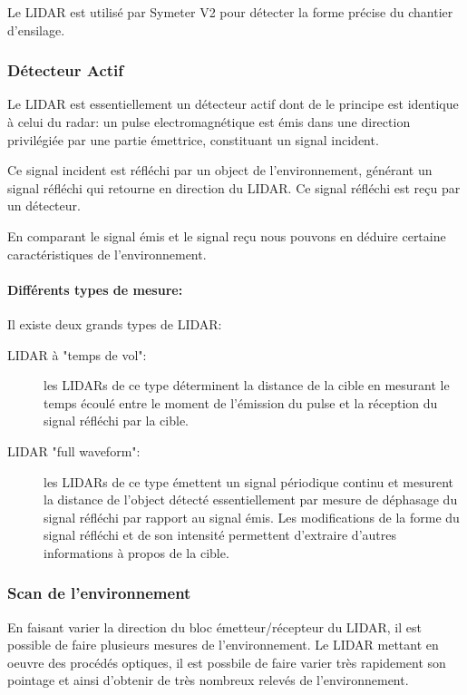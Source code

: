 \documentclass[12pt,a4paper]{report}
\begin{document}
		\para Le LIDAR est utilisé par Symeter V2 pour détecter la forme précise du chantier d'ensilage.
		
		\subsubsection{Détecteur Actif}
		Le LIDAR est essentiellement un détecteur actif dont de le principe est identique à celui du radar: un pulse electromagnétique est émis dans une direction privilégiée par une partie émettrice, constituant un signal incident. 
		
		\para Ce signal incident est réfléchi par un object de l'environnement, générant un signal réfléchi qui retourne en direction du LIDAR. Ce signal réfléchi est reçu par un détecteur. 
		
		\para En comparant le signal émis et le signal reçu nous pouvons en déduire certaine caractéristiques de l'environnement.
		
		\paragraph*{Différents types de mesure: } Il existe deux grands types de LIDAR: \begin{description}
			\item[LIDAR  à "temps de vol":] les LIDARs de ce type déterminent la distance de la cible en mesurant le temps écoulé entre le moment de l'émission du pulse et la réception du signal réfléchi par la cible.
			\item[LIDAR  "full waveform":] les LIDARs de ce type émettent un signal périodique continu et mesurent la distance de l'object détecté essentiellement par mesure de déphasage du signal réfléchi par rapport au signal émis. Les modifications de la forme du signal réfléchi et de son intensité permettent d'extraire d'autres informations à propos de la cible. 
		\end{description} 
		
		\subsubsection{Scan de l'environnement}
		En faisant varier la direction du bloc émetteur/récepteur du LIDAR, il est possible de faire plusieurs mesures de l'environnement. Le LIDAR mettant en oeuvre des procédés optiques, il est possbile de faire varier très rapidement son pointage et ainsi d'obtenir de très nombreux relevés de l'environnement.
		
\end{document}
